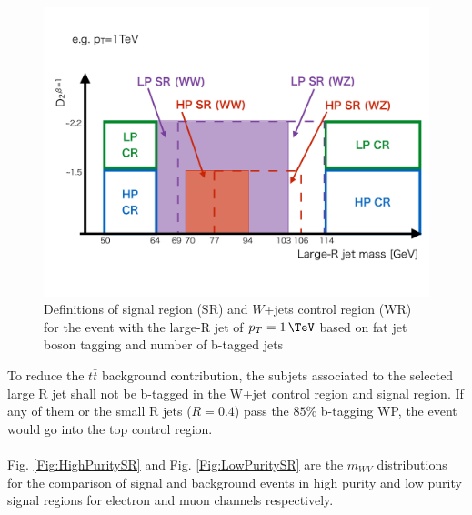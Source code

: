 \begin{figure}[h]
	\centering
	\includegraphics[width=0.8\hsize]{Chapter3/HPLPdefinitions}
	\caption{Definitions of signal region (SR) and $W$+jets control region (WR) for the event with the large-R jet of $\pt=1\,\TeV$ based on fat jet boson tagging and number of b-tagged jets }
	\label{Fig:HPLPdefinitions}
\end{figure}
\noindent
To reduce the $t\bar{t}$ background contribution, the subjets associated to the selected large R jet shall not be b-tagged in the W+jet control region and signal region. If any of them or the small R jets ($R=0.4$) pass the $85\%$ b-tagging WP, the event would go into the top control region. 
\\
\\Fig. \ref{Fig:HighPuritySR} and Fig. \ref{Fig:LowPuritySR} are the $m_{WV}$ distributions for the comparison of signal and background events in high purity and low purity signal regions for electron and muon channels respectively. 
